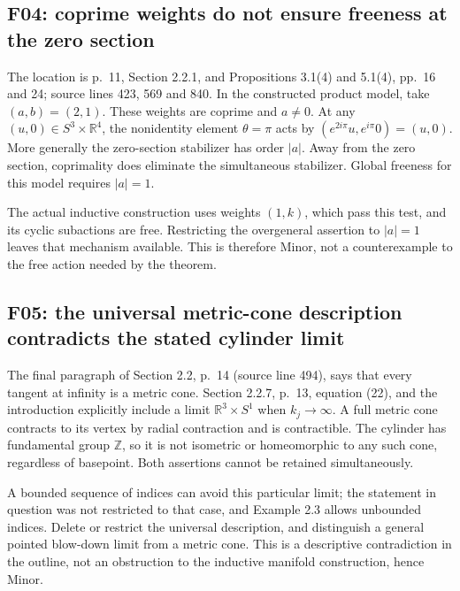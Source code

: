 \documentclass[10pt]{article}
\begin{document}
\subsection*{F04: coprime weights do not ensure freeness at the zero section}
The location is p. 11, Section 2.2.1, and Propositions 3.1(4) and 5.1(4), pp. 16 and 24; source lines 423, 569 and 840. In the constructed product model, take \((a,b)=(2,1)\). These weights are coprime and \(a\ne0\). At any \((u,0)\in S^3\times\mathbb R^4\), the nonidentity element \(\theta=\pi\) acts by \((e^{2i\pi}u,e^{i\pi}0)=(u,0)\). More generally the zero-section stabilizer has order \(|a|\). Away from the zero section, coprimality does eliminate the simultaneous stabilizer. Global freeness for this model requires \(|a|=1\).\par
The actual inductive construction uses weights \((1,k)\), which pass this test, and its cyclic subactions are free. Restricting the overgeneral assertion to \(|a|=1\) leaves that mechanism available. This is therefore Minor, not a counterexample to the free action needed by the theorem.\par
\subsection*{F05: the universal metric-cone description contradicts the stated cylinder limit}
The final paragraph of Section 2.2, p. 14 (source line 494), says that every tangent at infinity is a metric cone. Section 2.2.7, p. 13, equation (22), and the introduction explicitly include a limit \(\mathbb R^3\times S^1\) when \(k_j\to\infty\). A full metric cone contracts to its vertex by radial contraction and is contractible. The cylinder has fundamental group \(\mathbb Z\), so it is not isometric or homeomorphic to any such cone, regardless of basepoint. Both assertions cannot be retained simultaneously.\par
A bounded sequence of indices can avoid this particular limit; the statement in question was not restricted to that case, and Example 2.3 allows unbounded indices. Delete or restrict the universal description, and distinguish a general pointed blow-down limit from a metric cone. This is a descriptive contradiction in the outline, not an obstruction to the inductive manifold construction, hence Minor.\par
\end{document}
